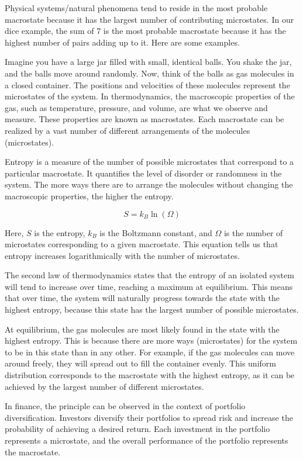 Physical systems/natural phenomena tend to reside in the most probable macrostate because it has the largest number of contributing microstates. In our dice example, the sum of 7 is the most probable macrostate because it has the highest number of pairs adding up to it. Here are some examples.

Imagine you have a large jar filled with small, identical balls. You shake the jar, and the balls move around randomly. Now, think of the balls as gas molecules in a closed container. The positions and velocities of these molecules represent the microstates of the system. In thermodynamics, the macroscopic properties of the gas, such as temperature, pressure, and volume, are what we observe and measure. These properties are known as macrostates. Each macrostate can be realized by a vast number of different arrangements of the molecules (microstates).

Entropy is a measure of the number of possible microstates that correspond to a particular macrostate. It quantifies the level of disorder or randomness in the system. The more ways there are to arrange the molecules without changing the macroscopic properties, the higher the entropy.

\[
S = k_B \ln(\Omega)
\]

Here, \( S \) is the entropy, \( k_B \) is the Boltzmann constant, and \( \Omega \) is the number of microstates corresponding to a given macrostate. This equation tells us that entropy increases logarithmically with the number of microstates.

The second law of thermodynamics states that the entropy of an isolated system will tend to increase over time, reaching a maximum at equilibrium. This means that over time, the system will naturally progress towards the state with the highest entropy, because this state has the largest number of possible microstates.

At equilibrium, the gas molecules are most likely found in the state with the highest entropy. This is because there are more ways (microstates) for the system to be in this state than in any other. For example, if the gas molecules can move around freely, they will spread out to fill the container evenly. This uniform distribution corresponds to the macrostate with the highest entropy, as it can be achieved by the largest number of different microstates.

In finance, the principle can be observed in the context of portfolio diversification. Investors diversify their portfolios to spread risk and increase the probability of achieving a desired return. Each investment in the portfolio represents a microstate, and the overall performance of the portfolio represents the macrostate.

